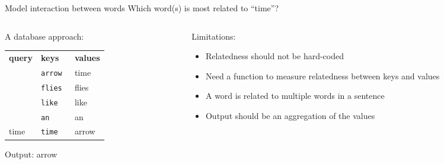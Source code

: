 \documentclass[usenames,dvipsnames,notes,11pt,aspectratio=169,hyperref={colorlinks=true, linkcolor=blue}]{beamer}
\begin{document}
\begin{frame}
    {Model interaction between words}
    Which word(s) is most related to ``time''?
    \bigskip\pause

    \begin{columns}
        \begin{column}{0.4\textwidth}
            A database approach: 
            \begin{table}
            \begin{tabular}{lll}
                \textbf{query} & \textbf{keys} & \textbf{values} \\
                &\texttt{arrow} & time \\
                &\texttt{flies }& flies \\
                &\texttt{like }& like \\
                &\texttt{an }& an \\
                time &\texttt{time}& arrow\\
            \end{tabular}
            \end{table}
            \pause
            Output: arrow
        \end{column}
        \pause
        \begin{column}{0.6\textwidth}
            Limitations:\\
            \begin{itemize}[<+->]
                \item Relatedness should not be hard-coded
                \item[] Need a function to measure relatedness between keys and values
                \item A word is related to multiple words in a sentence
                \item[] Output should be an aggregation of the values 
            \end{itemize}
        \end{column}
    \end{columns}
\end{frame}
\end{document}
